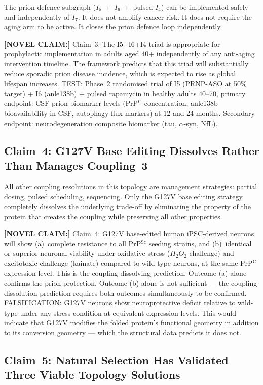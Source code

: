 \documentclass[12pt,a4paper]{article}
\newcommand{\prpc}{PrP$^{\mathrm{C}}$}
\newcommand{\prpsc}{PrP$^{\mathrm{Sc}}$}
\newcommand{\novel}[1]{\noindent\colorbox{yellow!18}{\parbox{\dimexpr\linewidth-2\fboxsep}{%
  \textbf{[NOVEL CLAIM:]} #1}}\vspace{0.4em}}
\newcommand{\Inet}[1]{$I_{#1}$}
\begin{document}
The prion defence subgraph (\Inet{5}~+~\Inet{6}~+~pulsed \Inet{4}) can be
implemented safely and independently of \Inet{7}. It does not amplify cancer
risk. It does not require the aging arm to be active. It closes the prion
defence loop independently.

\novel{Claim~3: The I5+I6+I4 triad is appropriate for prophylactic
implementation in adults aged 40+ independently of any anti-aging
intervention timeline. The framework predicts that this triad will
substantially reduce sporadic prion disease incidence, which is expected
to rise as global lifespan increases. TEST: Phase~2 randomised trial of
I5 (PRNP-ASO at 50\% target) + I6 (anle138b) + pulsed rapamycin in
healthy adults 40--70, primary endpoint: CSF prion biomarker levels
(\prpc{} concentration, anle138b bioavailability in CSF, autophagy flux
markers) at 12 and 24 months. Secondary endpoint: neurodegeneration
composite biomarker (tau, $\alpha$-syn, NfL).}

\subsection{Claim~4: G127V Base Editing Dissolves Rather Than Manages Coupling~3}

All other coupling resolutions in this topology are management strategies:
partial dosing, pulsed scheduling, sequencing. Only the G127V base editing
strategy completely dissolves the underlying trade-off by eliminating the
property of the protein that creates the coupling while preserving all other
properties.

\novel{Claim~4: G127V base-edited human iPSC-derived neurons will show
(a)~complete resistance to all \prpsc{} seeding strains, and (b)~identical
or superior neuronal viability under oxidative stress (\(H_2O_2\) challenge)
and excitotoxic challenge (kainate) compared to wild-type neurons, at the
same \prpc{} expression level. This is the coupling-dissolving prediction.
Outcome (a) alone confirms the prion protection. Outcome (b) alone is not
sufficient --- the coupling dissolution prediction requires both outcomes
simultaneously to be confirmed. FALSIFICATION: G127V neurons show
neuroprotective deficit relative to wild-type under any stress condition
at equivalent expression levels. This would indicate that G127V modifies
the folded protein's functional geometry in addition to its conversion
geometry --- which the structural data predicts it does not.}

\subsection{Claim~5: Natural Selection Has Validated Three Viable Topology Solutions}
\end{document}
